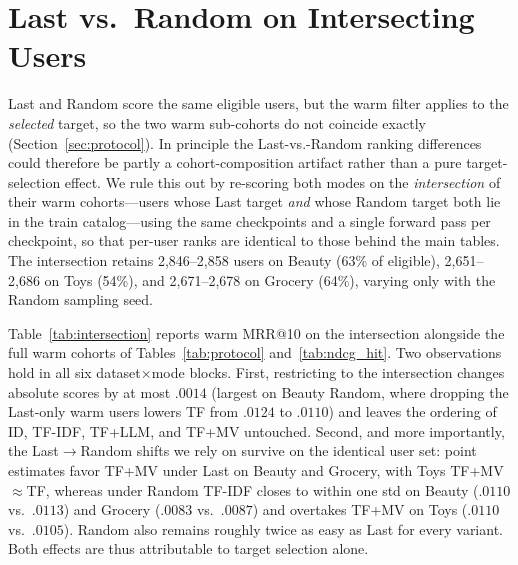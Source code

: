 \documentclass[sigconf,natbib=true,anonymous]{acmart}
\newcommand{\tfidf}{\textsc{TF-IDF}\xspace}
\newcommand{\tfllm}{\textsc{TF+LLM}\xspace}
\newcommand{\tfmv}{\textsc{TF+MV}\xspace}
\begin{document}
\section{Last vs.\ Random on Intersecting Users}
\label{app:intersection}

Last and Random score the same eligible users, but the warm filter applies to the \emph{selected} target, so the two warm sub-cohorts do not coincide exactly (Section~\ref{sec:protocol}).
In principle the Last-vs.-Random ranking differences could therefore be partly a cohort-composition artifact rather than a pure target-selection effect.
We rule this out by re-scoring both modes on the \emph{intersection} of their warm cohorts---users whose Last target \emph{and} whose Random target both lie in the train catalog---using the same checkpoints and a single forward pass per checkpoint, so that per-user ranks are identical to those behind the main tables.
The intersection retains 2{,}846--2{,}858 users on Beauty (63\% of eligible), 2{,}651--2{,}686 on Toys (54\%), and 2{,}671--2{,}678 on Grocery (64\%), varying only with the Random sampling seed.

Table~\ref{tab:intersection} reports warm MRR@10 on the intersection alongside the full warm cohorts of Tables~\ref{tab:protocol} and~\ref{tab:ndcg_hit}.
Two observations hold in all six dataset$\times$mode blocks.
First, restricting to the intersection changes absolute scores by at most $.0014$ (largest on Beauty Random, where dropping the Last-only warm users lowers TF from $.0124$ to $.0110$) and leaves the ordering of ID, \tfidf, \tfllm, and \tfmv untouched.
Second, and more importantly, the Last$\to$Random shifts we rely on survive on the identical user set: point estimates favor \tfmv under Last on Beauty and Grocery, with Toys TF+MV${}\approx{}$TF, whereas under Random \tfidf closes to within one std on Beauty ($.0110$ vs.\ $.0113$) and Grocery ($.0083$ vs.\ $.0087$) and overtakes \tfmv on Toys ($.0110$ vs.\ $.0105$).
Random also remains roughly twice as easy as Last for every variant.
Both effects are thus attributable to target selection alone.
\end{document}
